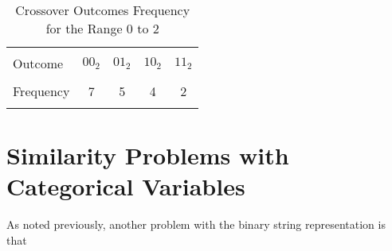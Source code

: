 %
\begin{table}
\caption{Crossover Outcomes Frequency for the Range 0 to 2}
\label{tab:crossoveroutcomefrequency0to2}
\begin{center}
	\begin{tabular}{lcccc}
		\hline \\[-0.75pc]
		Outcome	&	$00_2$	&	$01_2$	&	$10_2$	&	$11_2$	 \\[0.75pc]
		\hline \\[-0.75pc]
		Frequency&	7			&	5			&	4			&	2			 \\[0.5pc]
		\hline\\[-0.75pc]
	\end{tabular}
\end{center}
\end{table}
%



\section{Similarity Problems with Categorical Variables}
As noted previously, another problem with the binary string representation is that 